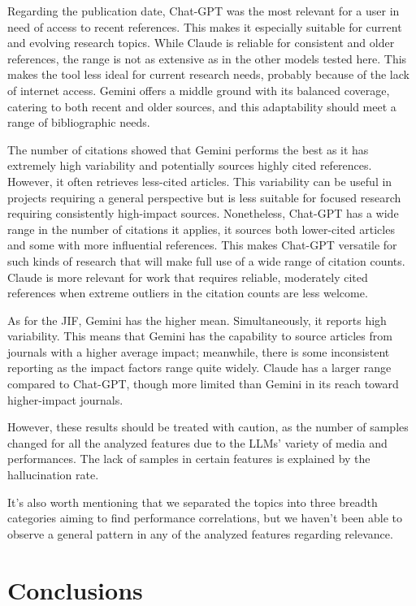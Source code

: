 \documentclass[runningheads]{llncs}
\begin{document}
Regarding the publication date, Chat-GPT was the most relevant for a user in need of access to recent references. This makes it especially suitable for current and evolving research topics. While Claude is reliable for consistent and older references, the range is not as extensive as in the other models tested here. This makes the tool less ideal for current research needs, probably because of the lack of internet access. Gemini offers a middle ground with its balanced coverage, catering to both recent and older sources, and this adaptability should meet a range of bibliographic needs.

The number of citations showed that Gemini performs the best as it has extremely high variability and potentially sources highly cited references. However, it often retrieves less-cited articles. This variability can be useful in projects requiring a general perspective but is less suitable for focused research requiring consistently high-impact sources. Nonetheless, Chat-GPT has a wide range in the number of citations it applies, it sources both lower-cited articles and some with more influential references. This makes Chat-GPT versatile for such kinds of research that will make full use of a wide range of citation counts.
Claude is more relevant for work that requires reliable, moderately cited references when extreme outliers in the citation counts are less welcome.

As for the JIF, Gemini has the higher mean. Simultaneously, it reports high variability. This means that Gemini has the capability to source articles from journals with a higher average impact; meanwhile, there is some inconsistent reporting as the impact factors range quite widely. Claude has a larger range compared to Chat-GPT, though more limited than Gemini in its reach toward higher-impact journals.

However, these results should be treated with caution, as the number of samples changed for all the analyzed features due to the LLMs' variety of media and performances. The lack of samples in certain features is explained by the hallucination rate.

It's also worth mentioning that we separated the topics into three breadth categories aiming to find performance correlations, but we haven't been able to observe a general pattern in any of the analyzed features regarding relevance.

\section{Conclusions}
\end{document}
